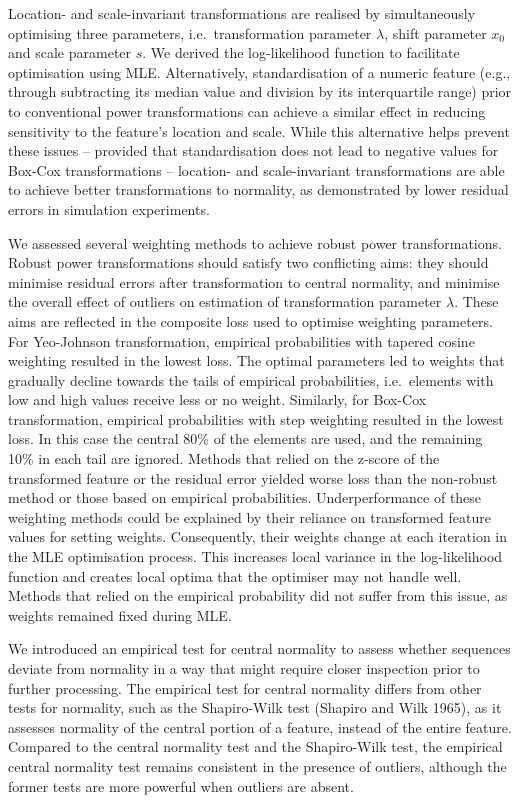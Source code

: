 \documentclass[
  a4paper,
]{article}
\begin{document}
Location- and scale-invariant transformations are realised by
simultaneously optimising three parameters, i.e.~transformation
parameter \(\lambda\), shift parameter \(x_0\) and scale parameter
\(s\). We derived the log-likelihood function to facilitate optimisation
using MLE. Alternatively, standardisation of a numeric feature (e.g.,
through subtracting its median value and division by its interquartile
range) prior to conventional power transformations can achieve a similar
effect in reducing sensitivity to the feature's location and scale.
While this alternative helps prevent these issues -- provided that
standardisation does not lead to negative values for Box-Cox
transformations -- location- and scale-invariant transformations are
able to achieve better transformations to normality, as demonstrated by
lower residual errors in simulation experiments.

We assessed several weighting methods to achieve robust power
transformations. Robust power transformations should satisfy two
conflicting aims: they should minimise residual errors after
transformation to central normality, and minimise the overall effect of
outliers on estimation of transformation parameter \(\lambda\). These
aims are reflected in the composite loss used to optimise weighting
parameters. For Yeo-Johnson transformation, empirical probabilities with
tapered cosine weighting resulted in the lowest loss. The optimal
parameters led to weights that gradually decline towards the tails of
empirical probabilities, i.e.~elements with low and high values receive
less or no weight. Similarly, for Box-Cox transformation, empirical
probabilities with step weighting resulted in the lowest loss. In this
case the central 80\% of the elements are used, and the remaining 10\%
in each tail are ignored. Methods that relied on the z-score of the
transformed feature or the residual error yielded worse loss than the
non-robust method or those based on empirical probabilities.
Underperformance of these weighting methods could be explained by their
reliance on transformed feature values for setting weights.
Consequently, their weights change at each iteration in the MLE
optimisation process. This increases local variance in the
log-likelihood function and creates local optima that the optimiser may
not handle well. Methods that relied on the empirical probability did
not suffer from this issue, as weights remained fixed during MLE.

We introduced an empirical test for central normality to assess whether
sequences deviate from normality in a way that might require closer
inspection prior to further processing. The empirical test for central
normality differs from other tests for normality, such as the
Shapiro-Wilk test (Shapiro and Wilk 1965), as it assesses normality of
the central portion of a feature, instead of the entire feature.
Compared to the central normality test and the Shapiro-Wilk test, the
empirical central normality test remains consistent in the presence of
outliers, although the former tests are more powerful when outliers are
absent.
\end{document}
